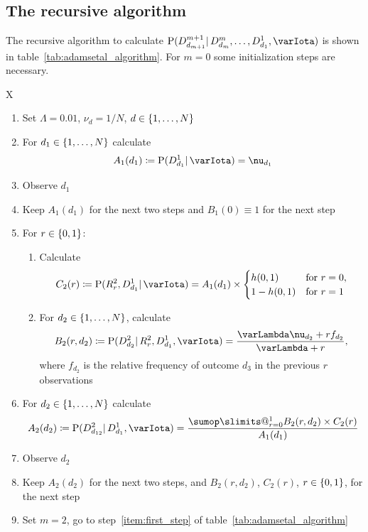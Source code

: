 \documentclass[\ifafour a4paper,12pt,\else a5paper,10pt,\fi%
onecolumn,oneside,article,%
british%
]{memoir}
\makeatletter
\theoremstyle{remark}
\theoremstyle{innote}
\def\sum{\DOTSI\sumop\slimits@}
\newcommand*{\defd}{\coloneqq}
\DeclarePairedDelimiter\set{\{}{\}}
\newcommand*{\p}{\mathrm{P}}%
\renewcommand*{\|}{\mathpunct{|}}
\newcommand*{\yff}{f}
\newcommand*{\yI}{\varIota}
\newcommand*{\yN}{\varLambda}
\newcommand*{\ynn}{\nu}
\newcommand*{\yrs}{h}
\makeatother
\begin{document}
\subsection{The recursive algorithm}
\label{sec:adamsetal_algorithm}

The recursive algorithm to calculate
$\p(D^{m+1}_{d_{m+1}} \| D^{m}_{d_{m}}, \dotsc, D^{1}_{d_{1}}, \yI)$ is
shown in table~\ref{tab:adamsetal_algorithm}. For $m=0$ some initialization
steps are necessary.
\begin{table}[!b]
  \centering
  \caption{Initial steps of predictive algorithm}
  \label{tab:adamsetal_initial}
  \begin{tabularx}{\textwidth}{X}\hline
    \begin{enumerate}%
    \item Set $\yN=0.01$, $\ynn_d=1/N$, $d\in\set{1,\dotsc,N}$
    \item For $d_1 \in \set{1,\dotsc,N}$ calculate
      \[A_1(d_1)\defd \p(D^{1}_{d_{1}} \|  \yI) =\ynn_{d_1} \]
    \item Observe $d_1$
    \item Keep  $A_1(d_1)$ for the next two steps and $B_1(0)\equiv 1$ for
      the next step

      \bigskip
    \item For $r \in\set{0,1}$:
      \begin{enumerate}[label*=\arabic*.]
   \item Calculate
      \[
        C_2(r) \defd \p(R^{2}_{r}, D^{1}_{d_1} \| \yI)
        =
A_1(d_1) \times \begin{cases}
          \yrs(0,1) &\text{for $r=0$},\\ 1-\yrs(0,1)&\text{for $r=1$}
        \end{cases}
      \]
      \item For $d_{2} \in \set{1,\dotsc,N}$, calculate
        \[ 
          B_{2}(r,d_{2}) \defd
          \p(D^{2}_{d_{2}} \| R^{2}_{r}, D^{1}_{d_{1}}, \yI) =
         \frac{\yN\ynn_{d_{2}}+r\yff_{d_{2}}}{\yN + r},
        \]
     where $\yff_{d_{2}}$ is the relative frequency of outcome $d_{3}$ in
     the previous $r$ observations
    \end{enumerate}
  \item  For $d_2 \in \set{1,\dotsc,N}$ calculate
      \[A_2(d_2) \defd
        \p(D^{2}_{d_{12}} \| D^{1}_{d_{1}}, \yI) =
\frac{\sum_{r=0}^{1} B_{2}(r,d_{2}) \times C_{2}(r)}{A_{1}(d_{1})} \]
\item Observe $d_2$
\item Keep $A_{2}(d_{2})$ for the next two steps, and
  $B_{2}(r,d_{2})$, $C_{2}(r)$, $r\in\set{0,1}$, for the next step
\item Set $m=2$, go to step~\ref{item:first_step} of table~\ref{tab:adamsetal_algorithm}
\end{enumerate}
\\\hline
  \end{tabularx}
\end{table}
\end{document}
